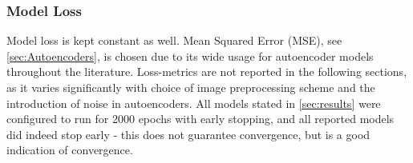 \subsubsection{Model Loss}
Model loss is kept constant as well. Mean Squared Error (MSE), see \autoref{sec:Autoencoders}, is chosen due to its wide usage for autoencoder models throughout the literature.
Loss-metrics are not reported in the following sections, as it varies significantly with choice of image preprocessing scheme and the introduction of noise in autoencoders.
All models stated in \autoref{sec:results} were configured to run for 2000 epochs with early stopping, and all reported models did indeed stop early - this does not guarantee convergence, but is a good indication of convergence.
